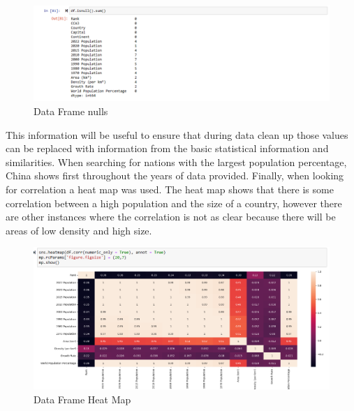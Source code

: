 \documentclass{article}
\begin{document}
\begin{figure}
    \centering
    \includegraphics[width=0.5\linewidth]{image3.png}
    \caption{Data Frame nulls}
    \label{fig:enter-label}
\end{figure}
This information will be useful to ensure that during data clean up those values can be replaced with information from the basic statistical information and similarities. When searching for nations with the largest population percentage, China shows first throughout the years of data provided. Finally, when looking for correlation a heat map was used. The heat map shows that there is some correlation between a high population and the size of a country, however there are other instances where the correlation is not as clear because there will be areas of low density and high size.
\begin{figure}
    \centering
    \includegraphics[width=0.5\linewidth]{image4.png}
    \caption{Data Frame Heat Map}
    \label{fig:enter-label}
\end{figure}
\end{document}
